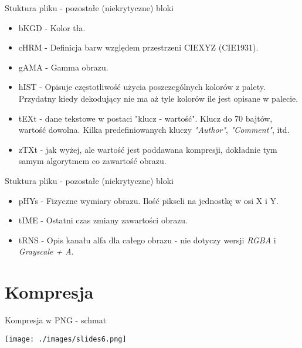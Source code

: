 \documentclass[presentation]{beamer}
\begin{document}
\begin{frame}[label={sec:org1c8b223}]{Stuktura pliku - pozostałe (niekrytyczne) bloki}
\begin{itemize}
\item {\color{blue}bKGD} - Kolor tła.
\item {\color{blue}cHRM} - Definicja barw względem przestrzeni CIEXYZ (CIE1931).
\item {\color{blue}gAMA} - Gamma obrazu.
\item {\color{blue}hIST} - Opisuje częstotliwość użycia poszczególnych kolorów z
palety. Przydatny kiedy dekodujący nie ma aż tyle kolorów ile jest
opisane w palecie.
\item {\color{blue}tEXt} - dane tekstowe w postaci "klucz - wartość". Klucz do 70
bajtów, wartość dowolna. Kilka predefiniowanych kluczy \emph{"Author"},
\emph{"Comment"}, itd.
\item {\color{blue}zTXt} - jak wyżej, ale wartość jest poddawana kompresji, dokładnie
tym samym algorytmem co zawartość obrazu.
\end{itemize}
\end{frame}

\begin{frame}[label={sec:org6e93924}]{Stuktura pliku - pozostałe (niekrytyczne) bloki}
\begin{itemize}
\item {\color{blue}pHYs} - Fizyczne wymiary obrazu. Ilość pikseli na jednostkę w osi X
i Y.
\item {\color{blue}tIME} - Ostatni czas zmiany zawartości obrazu.
\item {\color{blue}tRNS} - Opis kanału alfa dla całego obrazu - nie dotyczy wersji
\emph{RGBA} i \emph{Grayscale + A}.
\end{itemize}
\end{frame}

\section{Kompresja}
\label{sec:orgdfe24be}
\begin{frame}[label={sec:orgb2df5fd}]{Kompresja w PNG - schmat}
\begin{center}
\texttt{[image: ./images/slides6.png]}
\end{center}
\end{frame}
\end{document}
